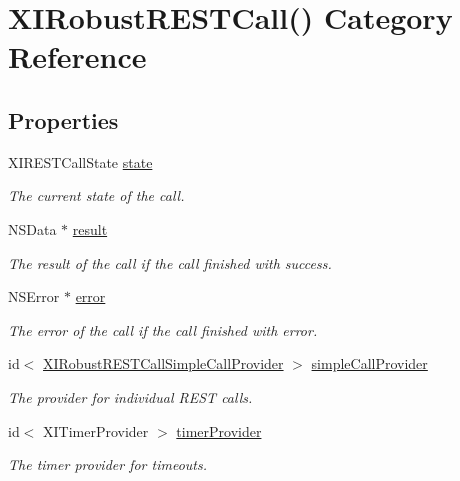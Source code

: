 \hypertarget{category_x_i_robust_r_e_s_t_call_07_08}{}\section{X\+I\+Robust\+R\+E\+S\+T\+Call() Category Reference}
\label{category_x_i_robust_r_e_s_t_call_07_08}
\subsection*{Properties}
\begin{DoxyCompactItemize}
\item 
X\+I\+R\+E\+S\+T\+Call\+State \hyperlink{category_x_i_robust_r_e_s_t_call_07_08_abf42c4db39f91e60f97a9e21216f463a}{state}
\begin{DoxyCompactList}\small\item\em The current state of the call. \end{DoxyCompactList}\item 
N\+S\+Data $\ast$ \hyperlink{category_x_i_robust_r_e_s_t_call_07_08_af60c21d6c194a2bb5a3758993e9d6a3d}{result}
\begin{DoxyCompactList}\small\item\em The result of the call if the call finished with success. \end{DoxyCompactList}\item 
N\+S\+Error $\ast$ \hyperlink{category_x_i_robust_r_e_s_t_call_07_08_a91411757abcf912073f533c900dd57bf}{error}
\begin{DoxyCompactList}\small\item\em The error of the call if the call finished with error. \end{DoxyCompactList}\item 
id$<$ \hyperlink{protocol_x_i_robust_r_e_s_t_call_simple_call_provider-p}{X\+I\+Robust\+R\+E\+S\+T\+Call\+Simple\+Call\+Provider} $>$ \hyperlink{category_x_i_robust_r_e_s_t_call_07_08_a1d70fa158b2c2c826c6001d95ebc50e5}{simple\+Call\+Provider}
\begin{DoxyCompactList}\small\item\em The provider for individual R\+E\+ST calls. \end{DoxyCompactList}\item 
id$<$ X\+I\+Timer\+Provider $>$ \hyperlink{category_x_i_robust_r_e_s_t_call_07_08_a5ee90c38f5c704c9a0eb8b4131798f43}{timer\+Provider}
\begin{DoxyCompactList}\small\item\em The timer provider for timeouts. \end{DoxyCompactList}\item 

\end{DoxyCompactItemize}
